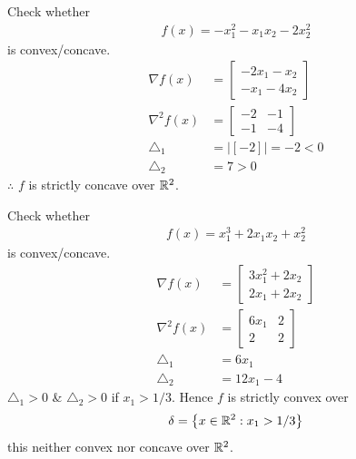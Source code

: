 \documentclass[11pt]{article}
\numberwithin{equation}{section}
\begin{document}
\begin{example}
    Check whether \begin{align*}
        f(x)=-x_{1}^{2}-x_{1} x_{2}-2 x_{2}^{2}
    \end{align*} is convex/concave. \begin{align*}
        \nabla f(x)&=\left[\begin{array}{l}
            -2 x_{1}-x_{2} \\
            -x_{1}-4 x_{2}
            \end{array}\right] \\
            \nabla^{2} f(x)&=\left[\begin{array}{cc}
        -2 & -1 \\
        -1 & -4
        \end{array}\right] \\
        \triangle_1 &= |[-2]|=-2 <0 \\
        \triangle_2 &=7 >0 
    \end{align*}
    $\therefore$ $f$ is strictly concave over $\mathbb R^2$.
\end{example}

\begin{example}
    Check whether \begin{align*}
        f(x)= x_{1}^{3}+2 x_{1} x_{2}+x_{2}^{2}
    \end{align*} is convex/concave. \begin{align*}
        \nabla f(x)&= \left[\begin{array}{l}
            3 x_{1}^{2}+2 x_{2} \\
            2 x_{1}+2 x_{2}
            \end{array}\right] \\
            \nabla^{2} f(x)&=\left[\begin{array}{cc}
        6x_1 & 2 \\
        2 & 2
        \end{array}\right] \\
        \triangle_1 &= 6x_1 \\
        \triangle_2 &= 12x_1 - 4
    \end{align*}
    $\triangle_1 > 0$ \& $\triangle_2 > 0$ if $x_1 > 1/3$.
    Hence $f$ is strictly convex over \begin{align*}
        \delta = \left\{x \in \mathbb R^{2}: x_{1}> 1/3 \right\}
    \end{align*}
    this neither convex nor concave over $\mathbb R^2$.
\end{example}
\end{document}
